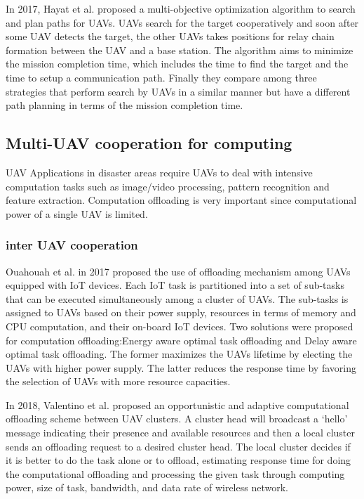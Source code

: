 \documentclass{ieeeaccess}
\begin{document}
In 2017, Hayat et al. proposed a multi-objective optimization algorithm to search and plan paths for UAVs\cite{Hayat 2017}.
UAVs search for the target cooperatively and soon after some UAV detects the target, the other UAVs takes positions for relay chain formation between the UAV and a base station.
The algorithm aims to minimize the mission completion time, which includes the time to find the target and the time to setup a communication path.
Finally they compare among three strategies that perform search by UAVs in a similar manner but have a different path planning in terms of the mission completion time.

\subsection{Multi-UAV cooperation for computing}\label{compute}
UAV Applications in disaster areas require UAVs to deal with intensive computation tasks such as image/video processing, pattern recognition and feature extraction. 
Computation offloading is very important since computational power of a single UAV is limited.
\subsubsection{inter UAV cooperation}
Ouahouah et al. in 2017 proposed the use of offloading mechanism among UAVs equipped with IoT devices\cite{Ouahouah2017}.
Each IoT task is partitioned into a set of sub-tasks that can be executed simultaneously among a cluster of UAVs.
The sub-tasks is assigned to UAVs based on their power supply, resources in terms of memory and CPU computation, and their on-board IoT devices.
Two solutions were proposed for computation offloading:Energy aware optimal task offloading and Delay aware optimal task offloading.
The former maximizes the UAVs lifetime by electing the UAVs with higher power supply.
The latter reduces the response time by favoring the selection of UAVs with more resource capacities.

In 2018, Valentino et al. proposed an opportunistic and adaptive computational offloading scheme between UAV clusters\cite{Valentino2018}.
A cluster head will broadcast a ‘hello' message indicating their presence and available resources and then a local cluster sends an offloading request to a desired cluster head.
The local cluster decides if it is better to do the task alone or to offload, estimating response time for doing the computational offloading and processing the given task through computing power, size of task, bandwidth, and data rate of wireless network.
\end{document}

